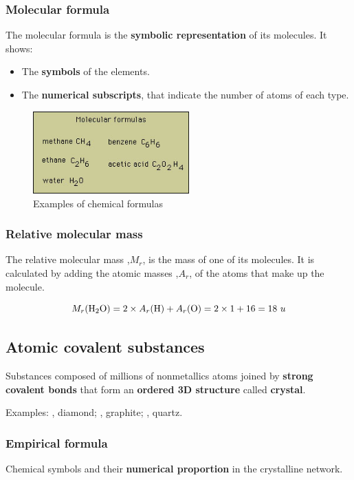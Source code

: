 \documentclass{article}
\begin{document}
			\subsubsection{Molecular formula}
				The molecular formula is the \textbf{symbolic representation} of its molecules. 
				It shows:

				\begin{itemize}
					\item The \textbf{symbols} of the elements.
					\item The \textbf{numerical subscripts}, that indicate the number of atoms of each type. 
				\end{itemize}

				\begin{figure}[htp]
					\centering
					\includegraphics[width=6cm]{formula.jpg}
					\caption{Examples of chemical formulas}
				\end{figure}

			\subsubsection{Relative molecular mass}
				The relative molecular mass ,\textbf{\textit{$M_{r}$}}, is the mass of one of its molecules.
				It is calculated by adding the atomic masses ,\textbf{\textit{$A_{r}$}},
				of the atoms that make up the molecule.

				\[ M_{r}(\ce{H2O}) = 2 \times A_{r}(\ce{H}) + A_{r}(\ce{O}) = 2 \times 1 + 16 = 18\ u\]
		
		\subsection{Atomic covalent substances}
			Substances composed of millions of nonmetallics atoms joined by \textbf{strong covalent bonds}
			 that form an \textbf{ordered 3D structure} called \textbf{crystal}.

			 Examples: \ce{C}, diamond; , graphite; , quartz.

			\subsubsection{Empirical formula}
				Chemical symbols and their \textbf{numerical proportion} in the crystalline network.
\end{document}
